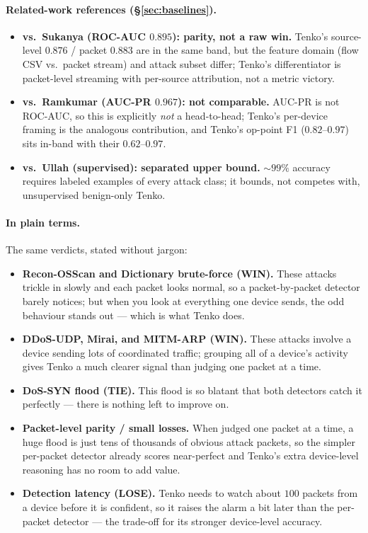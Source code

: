 \documentclass[11pt]{article}
\begin{document}
\paragraph{Related-work references (\S\ref{sec:baselines}).}
\begin{itemize}
  \item \textbf{vs.\ Sukanya (ROC-AUC $0.895$): parity, not a raw win.} Tenko's source-level $0.876$
        / packet $0.883$ are in the same band, but the feature domain (flow CSV vs.\ packet stream)
        and attack subset differ; Tenko's differentiator is packet-level streaming with per-source
        attribution, not a metric victory.
  \item \textbf{vs.\ Ramkumar (AUC-PR $0.967$): not comparable.} AUC-PR is not ROC-AUC, so this is
        explicitly \emph{not} a head-to-head; Tenko's per-device framing is the analogous
        contribution, and Tenko's op-point F1 ($0.82$--$0.97$) sits in-band with their $0.62$--$0.97$.
  \item \textbf{vs.\ Ullah (supervised): separated upper bound.} $\sim$$99\%$ accuracy requires
        labeled examples of every attack class; it bounds, not competes with, unsupervised
        benign-only Tenko.
\end{itemize}

\paragraph{In plain terms.} The same verdicts, stated without jargon:
\begin{itemize}
  \item \textbf{Recon-OSScan and Dictionary brute-force (WIN).} These attacks trickle in slowly and
        each packet looks normal, so a packet-by-packet detector barely notices; but when you look
        at everything one device sends, the odd behaviour stands out --- which is what Tenko does.
  \item \textbf{DDoS-UDP, Mirai, and MITM-ARP (WIN).} These attacks involve a device sending lots of
        coordinated traffic; grouping all of a device's activity gives Tenko a much clearer signal
        than judging one packet at a time.
  \item \textbf{DoS-SYN flood (TIE).} This flood is so blatant that both detectors catch it
        perfectly --- there is nothing left to improve on.
  \item \textbf{Packet-level parity / small losses.} When judged one packet at a time, a huge flood
        is just tens of thousands of obvious attack packets, so the simpler per-packet detector
        already scores near-perfect and Tenko's extra device-level reasoning has no room to add
        value.
  \item \textbf{Detection latency (LOSE).} Tenko needs to watch about $100$ packets from a device
        before it is confident, so it raises the alarm a bit later than the per-packet detector ---
        the trade-off for its stronger device-level accuracy.
\end{itemize}
\end{document}
